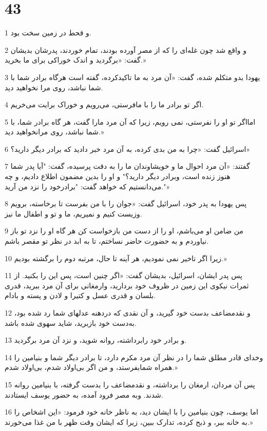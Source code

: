 \chapter{43}

\par 1 و قحط در زمین سخت بود.
\par 2 و واقع شد چون غله‌ای را که از مصر آورده بودند، تمام خوردند، پدرشان بدیشان گفت: «برگردید و اندک خوراکی برای ما بخرید.»
\par 3 یهودا بدو متکلم شده، گفت: «آن مرد به ما تاکیدکرده، گفته است هرگاه برادر شما با شما نباشد، روی مرا نخواهید دید.
\par 4 اگر تو برادر ما را با مافرستی، می‌رویم و خوراک برایت می‌خریم.
\par 5 امااگر تو او را نفرستی، نمی رویم، زیرا که آن مرد مارا گفت، هر گاه برادر شما، با شما نباشد، روی مرانخواهید دید.»
\par 6 اسرائیل گفت: «چرا به من بدی کرده، به آن مرد خبر دادید که برادر دیگر دارید؟»
\par 7 گفتند: «آن مرد احوال ما و خویشاوندان ما را به دقت پرسیده، گفت: "آیا پدر شما هنوز زنده است، وبرادر دیگر دارید؟" و او را بدین مضمون اطلاع دادیم، و چه می‌دانستیم که خواهد گفت: "برادرخود را نزد من آرید."»
\par 8 پس یهودا به پدر خود، اسرائیل گفت: «جوان را با من بفرست تا برخاسته، برویم وزیست کنیم و نمیریم، ما و تو و اطفال ما نیز.
\par 9 من ضامن او می‌باشم، او را از دست من بازخواست کن هر گاه او را نزد تو باز نیاوردم و به حضورت حاضر نساختم، تا به ابد در نظر تو مقصر باشم.
\par 10 زیرا اگر تاخیر نمی نمودیم، هر آینه تا حال، مرتبه دوم را برگشته بودیم.»
\par 11 پس پدر ایشان، اسرائیل، بدیشان گفت: «اگر چنین است، پس این را بکنید. از ثمرات نیکوی این زمین در ظروف خود بردارید، وارمغانی برای آن مرد ببرید، قدری بلسان و قدری عسل و کتیرا و لادن و پسته و بادام.
\par 12 و نقدمضاعف بدست خود گیرید، و آن نقدی که دردهنه عدلهای شما رد شده بود، به‌دست خود بازبرید، شاید سهوی شده باشد. 
\par 13 و برادر خود رابرداشته، روانه شوید، و نزد آن مرد برگردید.
\par 14 وخدای قادر مطلق شما را در نظر آن مرد مکرم دارد، تا برادر دیگر شما و بنیامین را همراه شمابفرستد، و من اگر بی‌اولاد شدم، بی‌اولاد شدم.»
\par 15 پس آن مردان، ارمغان را برداشته، و نقدمضاعف را بدست گرفته، با بنیامین روانه شدند. وبه مصر فرود آمده، به حضور یوسف ایستادند.
\par 16 اما یوسف، چون بنیامین را با ایشان دید، به ناظر خانه خود فرمود: «این اشخاص را به خانه ببر، و ذبح کرده، تدارک ببین، زیرا که ایشان وقت ظهر با من غذا می‌خورند.»
